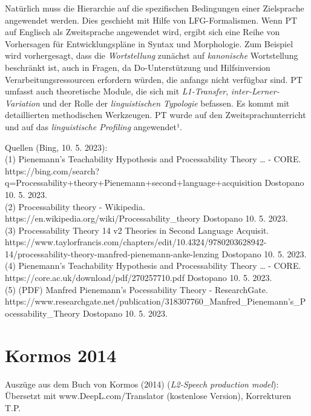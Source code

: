 \documentclass[
  letterpaper,
]{scrbook}
\begin{document}
Natürlich muss die Hierarchie auf die spezifischen Bedingungen einer
Zielsprache angewendet werden. Dies geschieht mit Hilfe von
LFG-Formalismen. Wenn PT auf Englisch als Zweitsprache angewendet wird,
ergibt sich eine Reihe von Vorhersagen für Entwicklungspläne in Syntax
und Morphologie. Zum Beispiel wird vorhergesagt, dass die
\emph{Wortstellung} zunächst auf \emph{kanonische} Wortstellung
beschränkt ist, auch in Fragen, da Do-Unterstützung und Hilfsinversion
Verarbeitungsressourcen erfordern würden, die anfangs nicht verfügbar
sind. PT umfasst auch theoretische Module, die sich mit
\emph{L1-Transfer}, \emph{inter-Lerner-Variation} und der Rolle der
\emph{linguistischen Typologie} befassen. Es kommt mit detaillierten
methodischen Werkzeugen. PT wurde auf den Zweitsprachunterricht und auf
das \emph{linguistische Profiling} angewendet¹.

Quellen (Bing, 10. 5. 2023):\\
(1) Pienemann's Teachability Hypothesis and Processability Theory
\ldots{} - CORE.
https://bing.com/search?q=Processability+theory+Pienemann+second+language+acquisition
Dostopano 10. 5. 2023.\\
(2) Processability theory - Wikipedia.
https://en.wikipedia.org/wiki/Processability\_theory Dostopano 10. 5.
2023.\\
(3) Processability Theory \textbar{} 14 \textbar{} v2 \textbar{}
Theories in Second Language Acquisit.
https://www.taylorfrancis.com/chapters/edit/10.4324/9780203628942-14/processability-theory-manfred-pienemann-anke-lenzing
Dostopano 10. 5. 2023.\\
(4) Pienemann's Teachability Hypothesis and Processability Theory
\ldots{} - CORE. https://core.ac.uk/download/pdf/270257710.pdf Dostopano
10. 5. 2023.\\
(5) (PDF) Manfred Pienemann's Pocessability Theory - ResearchGate.
https://www.researchgate.net/publication/318307760\_Manfred\_Pienemann's\_Pocessability\_Theory
Dostopano 10. 5. 2023.

\hypertarget{kormos-2014}{%
\section{Kormos 2014}\label{kormos-2014}}

Auszüge aus dem Buch von Kormos (2014) (\emph{L2-Speech production
model}): Übersetzt mit www.DeepL.com/Translator (kostenlose Version),
Korrekturen T.P.
\end{document}
